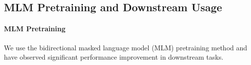 



\subsection{MLM Pretraining and Downstream Usage}
\paragraph{MLM Pretraining}\label{MLM}
We use the bidirectional masked language model (MLM) pretraining method and have observed significant performance improvement in downstream tasks. 

